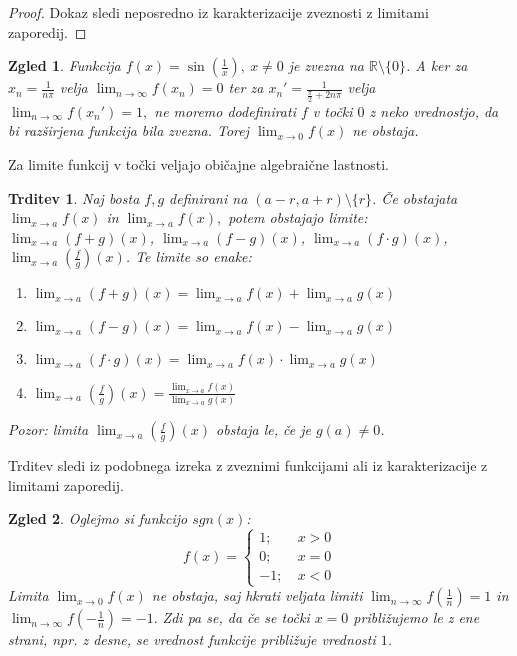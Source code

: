 \documentclass[10pt, a4paper]{article}
\newtheorem{trditev}[izr]{Trditev}
\newtheorem{zgled}{Zgled}[section]
\newenvironment{noticeC}{%
  \tcolorbox[%
  notitle,
  empty,
  enhanced,  %
  breakable,
  coltext=black, 
  fontupper=\rmfamily,
  parbox=false,
  noparskip,
  sharp corners,
  boxrule=-1pt,  %
  frame hidden,
  left=7pt,  %
  right=7pt,
  top=5pt,
  bottom=5pt,
  before skip=2.5ex plus 2pt,
  after skip=2.5ex plus 2pt,
  overlay unbroken and last={%
  },
  ]}
{\endtcolorbox}
\newenvironment{dokaz}%
  {\begin{noticeC}\begin{proof}}%
  {\end{proof}\end{noticeC}}
\newcommand{\R}{\mathbb {R}}
\newcommand{\limzap}[1]{\lim_{n \to \infty} {#1}}
\newcommand{\limf}[3]{\lim_{#1 \to #2} {#3}}
\begin{document}
\begin{dokaz}
    Dokaz sledi neposredno iz karakterizacije zveznosti z limitami zaporedij.
\end{dokaz}

\begin{zgled}
    Funkcija $f(x) = \sin \left( \frac{1}{x} \right),\ x \neq 0$ je zvezna na $\R \setminus \{0\}$.
    A ker za $x_n = \frac{1}{n \pi}$ velja $\limzap{f(x_n)} = 0$ ter za $x_n' = \frac{1}{\frac{\pi}{2} + 2n \pi}$ velja $\limzap{f(x_n')} = 1,$
    ne moremo dodefinirati $f$ v točki $0$ z neko vrednostjo, da bi razširjena funkcija bila zvezna.
    Torej $\limf{x}{0}{f(x)}$ ne obstaja.
\end{zgled}

Za limite funkcij v točki veljajo običajne algebraične lastnosti.

\begin{trditev}
    Naj bosta $f,g$ definirani na $(a-r, a+r) \setminus \{r\}$. Če obstajata $\limf{x}{a}{f(x)}$ in $\limf{x}{a}{f(x)},$ potem obstajajo limite:
    $\limf{x}{a}{(f+g)(x)}$, $\limf{x}{a}{(f-g)(x)}$, $\limf{x}{a}{(f \cdot g)(x)}$, $\limf{x}{a}{(\frac{f}{g})(x)}$.
    Te limite so enake:
    \begin{enumerate}
        \item $\limf{x}{a}{(f+g)(x)} = \limf{x}{a}{f(x)} + \limf{x}{a}{g(x)}$
        \item $\limf{x}{a}{(f-g)(x)} = \limf{x}{a}{f(x)} - \limf{x}{a}{g(x)}$
        \item $\limf{x}{a}{(f\cdot g)(x)} = \limf{x}{a}{f(x)} \cdot \limf{x}{a}{g(x)}$
        \item $\limf{x}{a}{(\frac{f}{g})(x)} = \frac{\limf{x}{a}{f(x)}}{\limf{x}{a}{g(x)}}$
    \end{enumerate}
    
    Pozor: limita $\limf{x}{a}{(\frac{f}{g})(x)}$ obstaja le, če je $g(a) \neq 0$.
\end{trditev}

Trditev sledi iz podobnega izreka z zveznimi funkcijami ali iz karakterizacije z limitami zaporedij.

\begin{zgled}
    Oglejmo si funkcijo $sgn (x)$:
    $$f(x) = \begin{cases}
        1;\ &x>0\\
        0;\ &x = 0\\
        -1;\ &x<0
    \end{cases}$$
    Limita $\limf{x}{0}{f(x)}$ ne obstaja, saj hkrati veljata limiti $\limzap{f(\frac{1}{n})} = 1$ in $\limzap{f(-\frac{1}{n})} = -1.$
    Zdi pa se, da če se točki $x=0$ približujemo le z ene strani, npr. z desne, se vrednost funkcije približuje vrednosti $1$.
\end{zgled}
\end{document}
